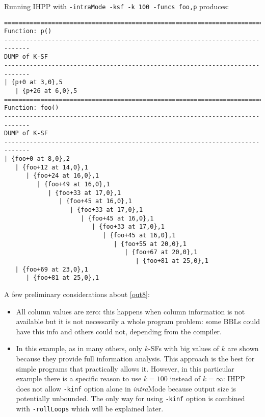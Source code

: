 \documentclass[a4paper,10pt]{report}
\begin{document}
\noindent
Running IHPP with \verb|-intraMode -ksf -k 100 -funcs foo,p| produces:

\begin{lstlisting}[label=out8, caption={IHPP partial output for \texttt{prog4}},frame=bottomline]
=============================================================================
Function: p()
-----------------------------------------------------------------------------
DUMP of K-SF
-----------------------------------------------------------------------------
| {p+0 at 3,0},5
   | {p+26 at 6,0},5
=============================================================================
Function: foo()
-----------------------------------------------------------------------------
DUMP of K-SF
-----------------------------------------------------------------------------
| {foo+0 at 8,0},2
   | {foo+12 at 14,0},1
      | {foo+24 at 16,0},1
         | {foo+49 at 16,0},1
            | {foo+33 at 17,0},1
               | {foo+45 at 16,0},1
                  | {foo+33 at 17,0},1
                     | {foo+45 at 16,0},1
                        | {foo+33 at 17,0},1
                           | {foo+45 at 16,0},1
                              | {foo+55 at 20,0},1
                                 | {foo+67 at 20,0},1
                                    | {foo+81 at 25,0},1
   | {foo+69 at 23,0},1
      | {foo+81 at 25,0},1

\end{lstlisting}

\noindent
A few preliminary considerations about \cref{out8}:
\renewcommand{\labelitemi}{$-$}

\begin{itemize}
\item All column values are zero: this happens when
column information is not available but it is not necessarily a whole program
problem: some BBLs could have this info and others could not, depending from the compiler.
\item In this example, as in many others, only $k$-SFs with big values of $k$
are shown because they provide full information analysis. This approach is the best for
simple programs that practically allows it.
However, in this particular example there is a specific reason to use $k=100$ instead of $k=\infty$: IHPP does not allow \verb|-kinf| option alone in \emph{intra}Mode because
output size is potentially unbounded. The only way for using \verb|-kinf| option is combined with \verb|-rollLoops| which will be explained later.
\end{itemize}
\renewcommand{\labelitemi}{$\bullet$}
\end{document}
